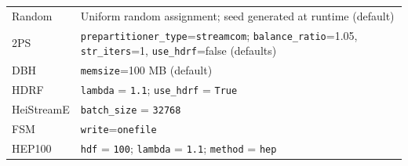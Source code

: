 \begin{longtable}{@{}>{\raggedright\arraybackslash}p{}>{\raggedright\arraybackslash}p{}@{}}
Random & Uniform random assignment; seed generated at runtime (default) \\
2PS & \texttt{prepartitioner\_type}=\texttt{streamcom}; \texttt{balance\_ratio}=1.05, \texttt{str\_iters}=1, \texttt{use\_hdrf}=false (defaults) \\
DBH & \texttt{memsize}=100 MB (default) \\
HDRF & \texttt{lambda} = \texttt{1.1}; \texttt{use\_hdrf} = \texttt{True} \\
HeiStreamE & \texttt{batch\_size} = \texttt{32768} \\
FSM & \texttt{write}=\texttt{onefile} \\
HEP100 & \texttt{hdf} = \texttt{100}; \texttt{lambda} = \texttt{1.1}; \texttt{method} = \texttt{hep} \\
\end{longtable}
\endgroup

